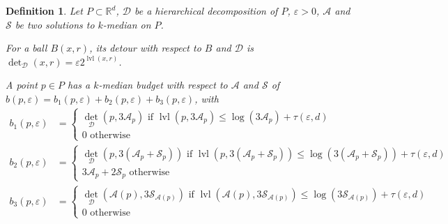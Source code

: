 \documentclass[11pt]{article}
\newtheorem{definition}[theorem]{Definition}
\newcommand{\R}{\mathbb R}
\newcommand{\eps}{\varepsilon}
\newcommand{\calD}{\mathcal {D}}
\newcommand{\calS}{\mathcal {S}}
\newcommand{\calL}{\mathcal{A}}
\newcommand{\offset}{\tau(\eps, d)}
\DeclareMathOperator{\deto}{det}
\newcommand{\lpar}{\left(}
\newcommand{\rpar}{\right)}
\DeclareMathOperator{\level}{lvl}
\newcommand{\david}[1]{\textcolor{orange}{#1}}
\begin{document}
\begin{definition}\label{def:budgetKmed}
Let $P\subset \R^d$, $\calD$ be 
a hierarchical decomposition of $P$, $\eps > 0$, $\calL$ and $\calS$ be two 
solutions to $k$-median on $P$. 

For a ball $B(x, r)$, its \emph{detour} with respect to $B$ and $\calD$ is $\deto_\calD(x, r) = \eps 2^{\level(x, r)}$.

A point $p\in P$ has a $k$-median budget with respect to $\calL$ and $\calS$ of $b(p, \eps) = b_1(p, \eps) + b_2(p, \eps) + b_3(p, \eps)$, with
\begin{align*}
    b_1(p, \eps) &= \begin{cases} 
 \deto_\calD(p, 3\calL_p)\text{ if } \level(p, 3\calL_p)\leq \log(3\calL_p) + \offset \\
  0\text{ otherwise }
\end{cases}
\\
b_2(p, \eps) &= \begin{cases} 
\deto_\calD\lpar p, 3(\calL_p + \calS_p)\rpar
 \text{ if } \level(p, 3(\calL_p + \calS_p))\leq \log(3(\calL_p + \calS_p)) + \offset \\
 3\calL_p + 2\calS_p \text{ otherwise }
\end{cases}
\\
b_3(p, \eps) &= \begin{cases} 
\deto_\calD(\calL(p),  3\calS_{\calL(p)})
 \text{ if } \level(\calL(p), 3\calS_{\calL(p)})\leq \log(3\calS_{\calL(p)}) + \offset \\
 0 \text{ otherwise }
\end{cases}
\end{align*}
\end{definition}
\end{document}
